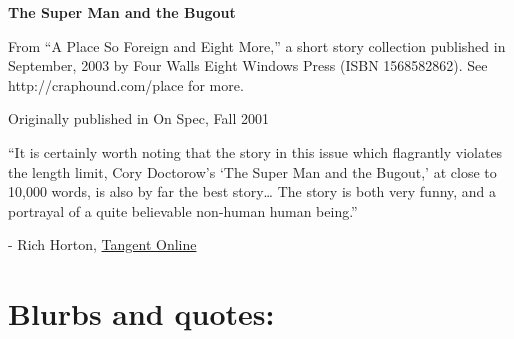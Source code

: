 

\newenvironment{authorof}{\begin{flushright}\sffamily}{\end{flushright}}


\begin{center}
\textbf{\huge\textsf{
The Super Man and the Bugout
}}
\end{center}


\noindent

From ``A Place So Foreign and Eight More,'' a short story
collection published in September, 2003 by Four Walls Eight Windows
Press (ISBN 1568582862). See http://craphound.com/place for more.

Originally published in On Spec, Fall 2001

``It is certainly worth noting that the story in this issue which flagrantly 
violates the length limit, Cory Doctorow's `The Super Man and the Bugout,' at 
close to 10,000 words, is also by far the best story\ldots{} The story is both 
very funny, and a portrayal of a quite believable non-human human being.''

\begin{authorof}
- Rich Horton,
  \href{http://www.tangentonline.com/reviews/magazine.php3?review=153}
  {Tangent Online}
\end{authorof}

\section{Blurbs and quotes:}

